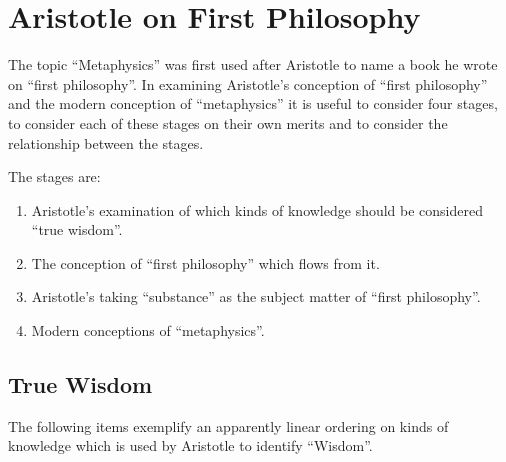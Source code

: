 \documentclass[10pt,titlepage]{article}
\begin{document}
\section{Aristotle on First Philosophy}

The topic ``Metaphysics'' was first used after Aristotle to name a book he wrote on ``first philosophy''.
In examining Aristotle's conception of ``first philosophy'' and the modern conception of ``metaphysics'' it is useful to consider four stages, to consider each of these stages on their own merits and to consider the relationship between the stages.

The stages are:
\begin{enumerate}
\item Aristotle's examination of which kinds of knowledge should be considered ``true wisdom''.
\item The conception of ``first philosophy'' which flows from it.
\item Aristotle's taking ``substance'' as the subject matter of ``first philosophy''.
\item Modern conceptions of ``metaphysics''.
\end{enumerate}

\subsection{True Wisdom}

The following items exemplify an apparently linear ordering on kinds of knowledge which is used by Aristotle to identify ``Wisdom''.
\end{document}
